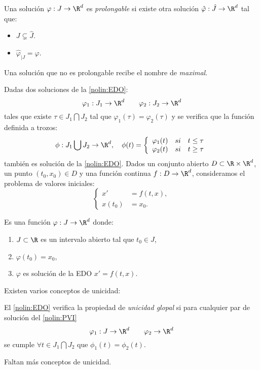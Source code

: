 \begin{ndef}
Una solución $\varphi : J \to \R^d$ es \emph{prolongable} si existe otra solución $\hat{\varphi} : \hat{J}\to\R^d$ tal que:
\begin{itemize}
\item $J\subsetneq \hat{J}$.
\item $\hat{\varphi}_{|J} = \varphi$.
\end{itemize}
\end{ndef}

\begin{ndef}
Una solución que no es prolongable recibe el nombre de \emph{maximal}.
\end{ndef}

Dadas dos soluciones de la \ref{nolin:EDO}:
$$\varphi_1:J_1\to \R^d \qquad \varphi_2 : J_2 \to \R^d$$
tales que existe $\tau \in J_1 \bigcap J_2 $ tal que $\varphi_1(\tau)=\varphi_2(\tau)$ y se verifica que la función definida a trozos:
$$
\phi : J_1 \bigcup J_2 \to \R^d, \quad \phi(t)=\left \{ \begin{array}{lcr}
\varphi_1(t) & si & t\leq \tau \\
\varphi_2(t) &  si & t\geq \tau
\end{array}
\right .
$$
también es solución de la \ref{nolin:EDO}.
Dados un conjunto abierto $D \subset \R \times \R^d$, un punto $(t_0,x_0)\in D$ y una función continua $f:D\to\R^d$, consideramos el problema de valores iniciales:
\begin{equation}
\left\{\begin{array}{rl}
x' &=f(t,x), \\
x(t_0)&=x_0.
\end{array}\right.
\tag{PVI}\label{nolin:PVI}
\end{equation}
\begin{ndef}
Es una función $\varphi : J \to \R^d$ donde:
\begin{enumerate}
\item $J\subset \R$ es un intervalo abierto tal que $t_0\in J$,
\item $\varphi(t_0)=x_0$,
\item $\varphi$ es solución de la EDO $x'=f(t,x)$.
\end{enumerate}
\end{ndef}

Existen varios conceptos de unicidad:

\begin{ndef}
El \ref{nolin:EDO} verifica la propiedad de \emph{unicidad glopal} si para cualquier par de solución del \ref{nolin:PVI}
$$\varphi_1:J\to\R^d \qquad \varphi_2\to\R^d$$
se cumple $\forall t \in J_1 \bigcap J_2$ que $\phi_1(t)=\phi_2(t)$.
\end{ndef}
\begin{ndef}

\end{ndef}

Faltan más conceptos de unicidad.

